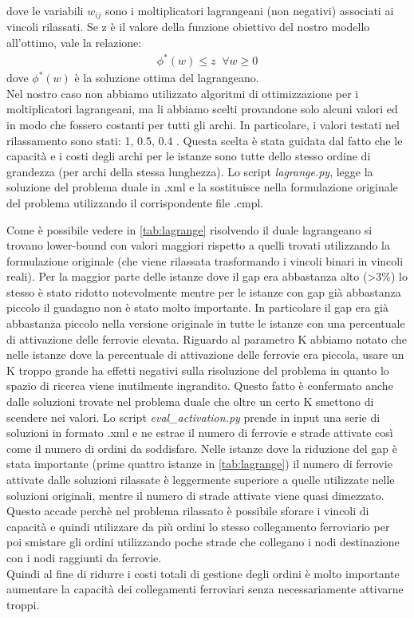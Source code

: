 \documentclass{article}
\begin{document}
dove le variabili $w_{ij}$ sono i moltiplicatori lagrangeani (non negativi) associati ai vincoli rilassati.
Se z è il valore della funzione obiettivo del nostro modello all'ottimo, vale la relazione:
\begin{align}
 \phi^*(w) \leq z \; \;     \forall w \geq 0
\end{align}
dove  $\phi^*(w)$ è la soluzione ottima del lagrangeano.
\\
Nel nostro caso non abbiamo utilizzato algoritmi di ottimizzazione per i moltiplicatori lagrangeani, ma li abbiamo scelti provandone solo alcuni valori ed in modo che fossero costanti per tutti gli archi. In particolare, i valori testati nel rilassamento sono stati: 1, 0.5, 0.4 .
Questa scelta è stata guidata dal fatto che le capacità e i costi degli archi per le istanze sono tutte dello stesso ordine di grandezza (per archi della stessa lunghezza). Lo script \emph{lagrange.py}, legge la soluzione del problema duale in .xml e la sostituisce nella formulazione originale del problema utilizzando il corrispondente file .cmpl.

Come è possibile vedere in \cref{tab:lagrange} risolvendo il duale lagrangeano si trovano lower-bound con valori maggiori rispetto a quelli trovati utilizzando la formulazione originale (che viene rilassata trasformando i vincoli binari in vincoli reali). Per la maggior parte delle istanze dove il gap era abbastanza alto (>3\%) lo stesso è stato ridotto notevolmente mentre per le istanze con gap già abbastanza piccolo il guadagno non è stato molto importante. In particolare il gap era già abbastanza piccolo nella versione originale in tutte le istanze con una percentuale di attivazione delle ferrovie elevata. Riguardo al parametro K abbiamo notato che nelle istanze dove la percentuale di attivazione delle ferrovie era piccola, usare un K troppo grande ha effetti negativi sulla risoluzione del problema in quanto lo spazio di ricerca viene inutilmente ingrandito. Questo fatto è confermato anche dalle soluzioni trovate nel problema duale che oltre un certo K smettono di scendere nei valori.
Lo script \emph{eval\_activation.py} prende in input una serie di soluzioni in formato .xml e ne estrae il numero di ferrovie e strade attivate così come il numero di ordini da soddisfare. Nelle istanze dove la riduzione del gap è stata importante (prime quattro istanze in \cref{tab:lagrange}) il numero di ferrovie attivate dalle soluzioni rilassate è leggermente superiore a quelle utilizzate nelle soluzioni originali, mentre il numero di strade attivate viene quasi dimezzato. Questo accade perchè nel problema rilassato è possibile sforare i vincoli di capacità e quindi utilizzare da più ordini lo stesso collegamento ferroviario per poi smistare gli ordini utilizzando poche strade che collegano i nodi destinazione con i nodi raggiunti da ferrovie.
\\
Quindi al fine di ridurre i costi totali di gestione degli ordini è molto importante aumentare la capacità dei collegamenti ferroviari senza necessariamente attivarne troppi.
\end{document}
